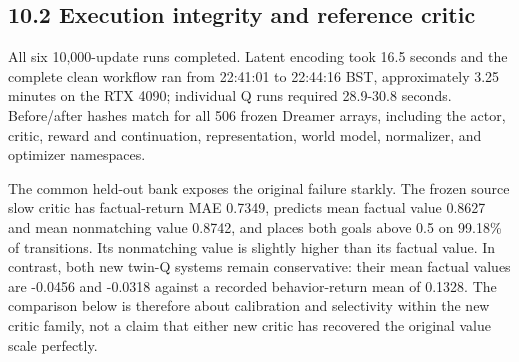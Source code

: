 \documentclass[10pt,a4paper]{article}
\newcommand{\reportsubsection}[1]{\subsection{\textcolor{brandblue}{#1}}}
\begin{document}
\reportsubsection{10.2 Execution integrity and reference critic}
All six 10,000-update runs completed. Latent encoding took 16.5 seconds and the complete clean workflow ran from 22:41:01 to 22:44:16 BST, approximately 3.25 minutes on the RTX 4090; individual Q runs required 28.9-30.8 seconds. Before/after hashes match for all 506 frozen Dreamer arrays, including the actor, critic, reward and continuation, representation, world model, normalizer, and optimizer namespaces.

The common held-out bank exposes the original failure starkly. The frozen source slow critic has factual-return MAE 0.7349, predicts mean factual value 0.8627 and mean nonmatching value 0.8742, and places both goals above 0.5 on 99.18\% of transitions. Its nonmatching value is slightly higher than its factual value. In contrast, both new twin-Q systems remain conservative: their mean factual values are -0.0456 and -0.0318 against a recorded behavior-return mean of 0.1328. The comparison below is therefore about calibration and selectivity within the new critic family, not a claim that either new critic has recovered the original value scale perfectly.
\end{document}
